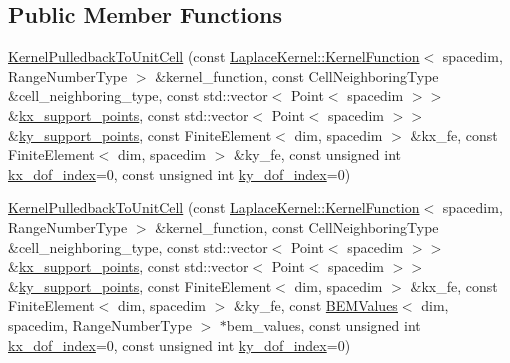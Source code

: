 \subsection*{Public Member Functions}
\begin{DoxyCompactItemize}
\item 
\hyperlink{classLaplaceBEM_1_1KernelPulledbackToUnitCell_a344ad653c5e57498cc005b5b683e8db6}{Kernel\+Pulledback\+To\+Unit\+Cell} (const \hyperlink{classLaplaceBEM_1_1LaplaceKernel_1_1KernelFunction}{Laplace\+Kernel\+::\+Kernel\+Function}$<$ spacedim, Range\+Number\+Type $>$ \&kernel\+\_\+function, const Cell\+Neighboring\+Type \&cell\+\_\+neighboring\+\_\+type, const std\+::vector$<$ Point$<$ spacedim $>$$>$ \&\hyperlink{classLaplaceBEM_1_1KernelPulledbackToUnitCell_ac7667f6cacebaed1a6ba39d67211db04}{kx\+\_\+support\+\_\+points}, const std\+::vector$<$ Point$<$ spacedim $>$$>$ \&\hyperlink{classLaplaceBEM_1_1KernelPulledbackToUnitCell_a92971044a5f8ce2f61688858a3deac8e}{ky\+\_\+support\+\_\+points}, const Finite\+Element$<$ dim, spacedim $>$ \&kx\+\_\+fe, const Finite\+Element$<$ dim, spacedim $>$ \&ky\+\_\+fe, const unsigned int \hyperlink{classLaplaceBEM_1_1KernelPulledbackToUnitCell_a66ba57ad86025978e5e5580c822aef89}{kx\+\_\+dof\+\_\+index}=0, const unsigned int \hyperlink{classLaplaceBEM_1_1KernelPulledbackToUnitCell_ae6f3e4bc6cf09546bf11d01812f9b692}{ky\+\_\+dof\+\_\+index}=0)
\item 
\hyperlink{classLaplaceBEM_1_1KernelPulledbackToUnitCell_a3ef9d5f4401cc8d6bd7c11955fadb770}{Kernel\+Pulledback\+To\+Unit\+Cell} (const \hyperlink{classLaplaceBEM_1_1LaplaceKernel_1_1KernelFunction}{Laplace\+Kernel\+::\+Kernel\+Function}$<$ spacedim, Range\+Number\+Type $>$ \&kernel\+\_\+function, const Cell\+Neighboring\+Type \&cell\+\_\+neighboring\+\_\+type, const std\+::vector$<$ Point$<$ spacedim $>$$>$ \&\hyperlink{classLaplaceBEM_1_1KernelPulledbackToUnitCell_ac7667f6cacebaed1a6ba39d67211db04}{kx\+\_\+support\+\_\+points}, const std\+::vector$<$ Point$<$ spacedim $>$$>$ \&\hyperlink{classLaplaceBEM_1_1KernelPulledbackToUnitCell_a92971044a5f8ce2f61688858a3deac8e}{ky\+\_\+support\+\_\+points}, const Finite\+Element$<$ dim, spacedim $>$ \&kx\+\_\+fe, const Finite\+Element$<$ dim, spacedim $>$ \&ky\+\_\+fe, const \hyperlink{classLaplaceBEM_1_1BEMValues}{B\+E\+M\+Values}$<$ dim, spacedim, Range\+Number\+Type $>$ $\ast$bem\+\_\+values, const unsigned int \hyperlink{classLaplaceBEM_1_1KernelPulledbackToUnitCell_a66ba57ad86025978e5e5580c822aef89}{kx\+\_\+dof\+\_\+index}=0, const unsigned int \hyperlink{classLaplaceBEM_1_1KernelPulledbackToUnitCell_ae6f3e4bc6cf09546bf11d01812f9b692}{ky\+\_\+dof\+\_\+index}=0)

\end{DoxyCompactItemize}
